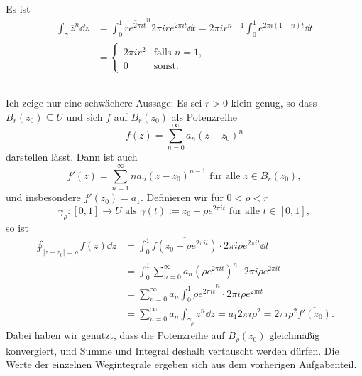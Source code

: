 \documentclass[a4paper,10pt]{article}
\begin{document}
\subsection{}
Es ist
\begin{align*}
 \int_\gamma \overline{z}^n \dd{z}
 &= \int_0^1 \overline{r e^{2\pi i t}}^n 2\pi i r e^{2\pi i t} \dd{t}
 = 2\pi i r^{n+1} \int_0^1 e^{2\pi i (1-n) t} \dd{t} \\
 &= \begin{cases} 2\pi i r^2 & \text{falls } n=1, \\ 0 & \text{sonst}. \end{cases}
\end{align*}


\subsection{}
Ich zeige nur eine schwächere Aussage: Es sei $r > 0$ klein genug, so dass $B_r(z_0) \subseteq U$ und sich $f$ auf $B_r(z_0)$ als Potenzreihe
\[
 f(z) = \sum_{n=0}^\infty a_n (z-z_0)^n
\]
darstellen lässt. Dann ist auch
\[
 f'(z) = \sum_{n=1}^\infty n a_n (z-z_0)^{n-1} \text{ für alle } z \in B_r(z_0),
\]
und insbesondere $f'(z_0) = a_1$. Definieren wir für $0 <\rho < r$
\[
 \gamma_\rho : [0,1] \to U \text{ als } \gamma(t) := z_0 + \rho e^{2\pi i t} \text{ für alle } t \in [0,1],
\]
so ist
\begin{align*}
 \oint_{|z-z_0| = \rho} \overline{f(z)} \dd{z}
 &= \int_0^1 \overline{f(z_0 + \rho e^{2\pi i t})} \cdot 2 \pi i \rho e^{2\pi it} \dd{t} \\
 &= \int_0^1 \overline{\sum_{n=0}^\infty a_n \left(\rho e^{2\pi i t}\right)^n} \cdot 2 \pi i \rho e^{2\pi i t} \\
 &= \sum_{n=0}^\infty \overline{a_n} \int_0^1 \overline{\rho e^{2\pi i t}}^n \cdot 2 \pi i \rho e^{2\pi i t} \\
 &= \sum_{n=0}^\infty \overline{a_n} \int_{\gamma_\rho} \overline{z}^n \dd{z}
 = \overline{a_1} 2 \pi i \rho^2
 = 2 \pi i \rho^2 \overline{f'(z_0)}.
\end{align*}
Dabei haben wir genutzt, dass die Potenzreihe auf $B_\rho(z_0)$ gleichmäßig konvergiert, und Summe und Integral deshalb vertauscht werden dürfen. Die Werte der einzelnen Wegintegrale ergeben sich aus dem vorherigen Aufgabenteil.








\addtocounter{section}{1}
\end{document}
